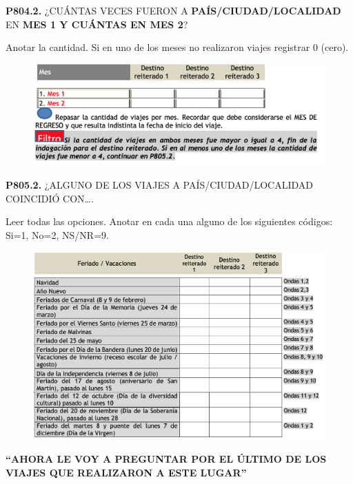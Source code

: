 \documentclass[
  openany]{book}
\begin{document}
\textbf{P804.2.} ¿CUÁNTAS VECES FUERON A \textbf{PAÍS/CIUDAD/LOCALIDAD} EN \textbf{MES 1 Y CUÁNTAS EN MES 2}?

Anotar la cantidad. Si en uno de los meses no realizaron viajes registrar 0 (cero).

\begin{figure}

{\centering \includegraphics[width=1\linewidth]{imagenes/figura6-258} 

}

\end{figure}

\textbf{P805.2.} ¿ALGUNO DE LOS VIAJES A PAÍS/CIUDAD/LOCALIDAD COINCIDIÓ CON\ldots.

Leer todas las opciones. Anotar en cada una alguno de los siguientes códigos: Si=1, No=2, NS/NR=9.

\begin{figure}

{\centering \includegraphics[width=1\linewidth]{imagenes/figura6-259} 

}

\end{figure}

\textbf{``AHORA LE VOY A PREGUNTAR POR EL ÚLTIMO DE LOS VIAJES QUE REALIZARON A ESTE LUGAR''}
\end{document}
